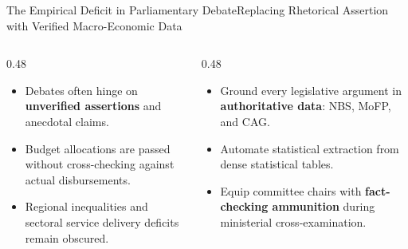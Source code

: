 \documentclass[aspectratio=169, 10pt]{beamer}
\begin{document}
\begin{frame}{The Empirical Deficit in Parliamentary Debate}{Replacing Rhetorical Assertion with Verified Macro-Economic Data}
  \begin{columns}[c]
    \begin{column}{0.48\textwidth}
      \begin{tcolorbox}[colback=lightgrey, colframe=tanzaniablue, arc=1.5mm, boxrule=0.8pt, title=\textbf{The Rhetoric Trap}]
        \small
        \begin{itemize}
          \item Debates often hinge on \textcolor{tanzaniablue}{\textbf{unverified assertions}} and anecdotal claims.
          \item Budget allocations are passed without cross-checking against actual disbursements.
          \item Regional inequalities and sectoral service delivery deficits remain obscured.
        \end{itemize}
      \end{tcolorbox}
    \end{column}
    \begin{column}{0.48\textwidth}
      \begin{tcolorbox}[colback=calloutbg, colframe=suagreen, arc=1.5mm, boxrule=0.8pt, title=\textbf{The Empirical Mandate}]
        \small
        \begin{itemize}
          \item Ground every legislative argument in \textcolor{suagreen}{\textbf{authoritative data}}: NBS, MoFP, and CAG.
          \item Automate statistical extraction from dense statistical tables.
          \item Equip committee chairs with \textcolor{darkcharcoal}{\textbf{fact-checking ammunition}} during ministerial cross-examination.
        \end{itemize}
      \end{tcolorbox}
    \end{column}
  \end{columns}
\end{frame}
\end{document}
